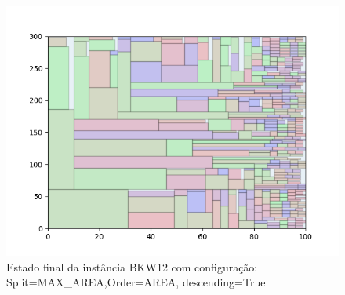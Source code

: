 \begin{figure}[H]
    \centering
    \caption[]{Estado final da instância BKW12 com configuração: Split=MAX_AREA,Order=AREA, descending=True}
    \label{fig:bkw12-max_area-area-true}
    \includegraphics[scale=0.5]{output/figures/bkw/bkw12/max_area/area/true/000}
\end{figure}